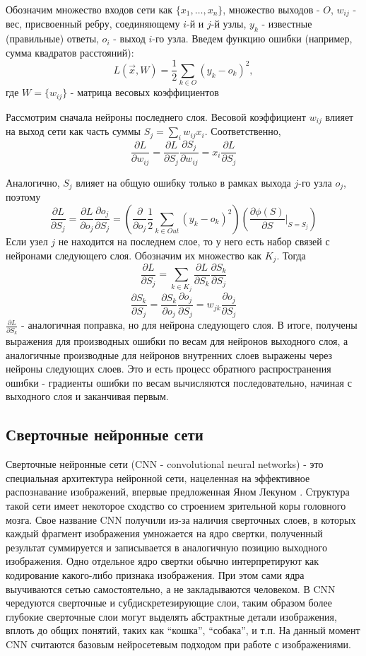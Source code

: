 		Обозначим множество входов сети как $\{x_1, \ldots, x_n\}$, множество выходов - $O$, $w_{ij}$ - вес, присвоенный ребру, соединяющему $i$-й и $j$-й узлы, $y_k$ - известные (правильные) ответы, $o_i$ - выход $i$-го узла. Введем функцию ошибки (например, сумма квадратов расстояний):
		$$ L(\vec{x}, W) = \frac{1}{2} \sum_{k \in O} (y_k - o_k)^2, $$
		где $W = \{w_{ij}\}$ - матрица весовых коэффициентов
		
		Рассмотрим сначала нейроны последнего слоя. Весовой коэффициент $w_{ij}$ влияет на выход сети как часть суммы $S_j = \sum_i w_{ij} x_i$. Соответственно,
		$$ \frac{\partial L}{\partial w_{ij}} = \frac{\partial L}{\partial S_j} \frac{\partial S_j}{\partial w_{ij}} = x_i \frac{\partial L}{\partial S_j} $$
		
		Аналогично, $S_j$ влияет на общую ошибку только в рамках выхода $j$-го узла $o_j$, поэтому
		$$ \frac{\partial L}{\partial S_j} = \frac{\partial L}{\partial o_j} \frac{\partial o_j}{\partial S_j}  = \left(\frac{\partial}{\partial o_j} \frac{1}{2} \sum_{k \in Out} (y_k - o_k)^2 \right) \left(\frac{\partial \phi(S)}{\partial S} \bigg|_{S = S_j} \right)$$
		Если узел $j$ не находится на последнем слое, то у него есть набор связей с нейронами следующего слоя. Обозначим их множество как $K_j$. Тогда
		$$ \frac{\partial L}{\partial S_j} = \sum_{k \in K_j} \frac{\partial L}{\partial S_k} \frac{\partial S_k}{\partial S_j} $$
		$$ \frac{\partial S_k}{\partial S_j} = \frac{\partial S_k}{\partial o_j} \frac{\partial o_j}{\partial S_j} = w_{jk}\frac{\partial o_j}{\partial S_j} $$
		$ \frac{\partial L}{\partial S_k}$ - аналогичная поправка, но для нейрона следующего слоя. В итоге, получены выражения для производных ошибки по весам для нейронов выходного слоя, а аналогичные производные для нейронов внутренних слоев выражены через нейроны следующих слоев. Это и есть процесс обратного распространения ошибки - градиенты ошибки по весам вычисляются последовательно, начиная с выходного слоя и заканчивая первым.
	\subsection{Сверточные нейронные сети}
		Сверточные нейронные сети (CNN - convolutional neural networks) - это специальная архитектура нейронной сети, нацеленная на эффективное распознавание изображений, впервые предложенная Яном Лекуном \cite{CNN-original}. Структура такой сети имеет некоторое сходство со строением зрительной коры головного мозга. Свое название CNN получили из-за наличия сверточных слоев, в которых каждый фрагмент изображения умножается на ядро свертки, полученный результат суммируется и записывается в аналогичную позицию выходного изображения. Одно отдельное ядро свертки обычно интерпретируют как кодирование какого-либо признака изображения. При этом сами ядра выучиваются сетью самостоятельно, а не закладываются человеком. В CNN чередуются сверточные и субдискретезирующие слои, таким образом более глубокие сверточные слои могут выделять абстрактные детали изображения, вплоть до общих понятий, таких как ``кошка'', ``собака'', и т.п. На данный момент CNN считаются базовым нейросетевым подходом при работе с изображениями.
